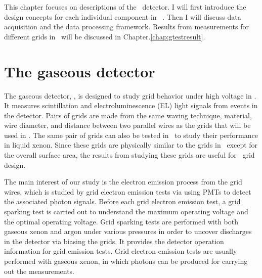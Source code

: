 

This chapter focuses on descriptions of the  \gtest\ detector. I will first introduce the design concepts for each individual component in \gtest\ . Then I will discuss data acquisition and the data processing framework.  Results from measurements for different grids in \gtest\ will be discussed in Chapter.\ref{chap:gtestresult}.

\section{The gaseous detector}
\label{sec:gtest dectector}
The gaseous detector, \gtest , is designed to study grid behavior under high voltage in \lze . It measures scintillation and electroluminescence (EL) light signals from events in the detector. Pairs of grids are made from the same waving technique, material, wire diameter, and distance between two parallel wires as the grids that will be used in \lze . %
The same pair of grids can also be tested in \phaseone\ to study their performance in liquid xenon. Since these grids are physically similar to the grids in \lze\ except for the overall surface area, the results from studying these grids are useful for \lze\ grid design. 

The main interest of our study is the electron emission process from the grid wires, which is studied by grid electron emission tests via using PMTs to detect the associated photon signals. Before each grid electron emission test, a grid sparking test is carried out to understand the maximum operating voltage and the optimal operating voltage. Grid sparking tests are performed with both gaseous xenon and argon under various pressures in order to uncover discharges in the detector via biasing the grids. It provides the detector operation information for grid emission tests. Grid electron emission tests are usually performed with gaseous xenon, in which photons can be produced for carrying out the \ees measurements. %

